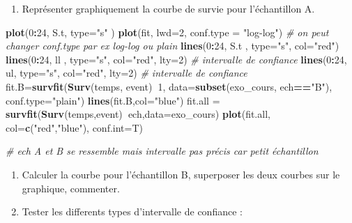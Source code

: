 \documentclass[
]{article}
\newenvironment{Shaded}{\begin{snugshade}}{\end{snugshade}}
\newcommand{\CommentTok}[1]{\textcolor[rgb]{0.56,0.35,0.01}{\textit{#1}}}
\newcommand{\DataTypeTok}[1]{\textcolor[rgb]{0.13,0.29,0.53}{#1}}
\newcommand{\DecValTok}[1]{\textcolor[rgb]{0.00,0.00,0.81}{#1}}
\newcommand{\KeywordTok}[1]{\textcolor[rgb]{0.13,0.29,0.53}{\textbf{#1}}}
\newcommand{\NormalTok}[1]{#1}
\newcommand{\OperatorTok}[1]{\textcolor[rgb]{0.81,0.36,0.00}{\textbf{#1}}}
\newcommand{\StringTok}[1]{\textcolor[rgb]{0.31,0.60,0.02}{#1}}
\providecommand{\tightlist}{%
  \setlength{\itemsep}{0pt}\setlength{\parskip}{0pt}}
\begin{document}
\begin{enumerate}
\def\labelenumi{\arabic{enumi})}
\setcounter{enumi}{2}
\tightlist
\item
  Représenter graphiquement la courbe de survie pour l'échantillon A.
\end{enumerate}

\begin{Shaded}
\begin{Highlighting}[]
\KeywordTok{plot}\NormalTok{(}\DecValTok{0}\OperatorTok{:}\DecValTok{24}\NormalTok{, S.t, }\DataTypeTok{type=}\StringTok{"s"}\NormalTok{ )}
\KeywordTok{plot}\NormalTok{(fit, }\DataTypeTok{lwd=}\DecValTok{2}\NormalTok{, }\DataTypeTok{conf.type =} \StringTok{"log-log"}\NormalTok{) }\CommentTok{# on peut changer conf.type par ex log-log ou plain}
\KeywordTok{lines}\NormalTok{(}\DecValTok{0}\OperatorTok{:}\DecValTok{24}\NormalTok{, S.t , }\DataTypeTok{type=}\StringTok{"s"}\NormalTok{, }\DataTypeTok{col=}\StringTok{"red"}\NormalTok{)}
\KeywordTok{lines}\NormalTok{(}\DecValTok{0}\OperatorTok{:}\DecValTok{24}\NormalTok{, ll , }\DataTypeTok{type=}\StringTok{"s"}\NormalTok{, }\DataTypeTok{col=}\StringTok{"red"}\NormalTok{, }\DataTypeTok{lty=}\DecValTok{2}\NormalTok{) }\CommentTok{# intervalle de confiance}
\KeywordTok{lines}\NormalTok{(}\DecValTok{0}\OperatorTok{:}\DecValTok{24}\NormalTok{, ul, }\DataTypeTok{type=}\StringTok{"s"}\NormalTok{, }\DataTypeTok{col=}\StringTok{"red"}\NormalTok{, }\DataTypeTok{lty=}\DecValTok{2}\NormalTok{)  }\CommentTok{# intervalle de confiance}
\NormalTok{fit.B=}\KeywordTok{survfit}\NormalTok{(}\KeywordTok{Surv}\NormalTok{(temps, event)}\OperatorTok{~}\DecValTok{1}\NormalTok{, }\DataTypeTok{data=}\KeywordTok{subset}\NormalTok{(exo_cours, ech}\OperatorTok{==}\StringTok{"B"}\NormalTok{), }\DataTypeTok{conf.type=}\StringTok{"plain"}\NormalTok{)}
\KeywordTok{lines}\NormalTok{(fit.B,}\DataTypeTok{col=}\StringTok{"blue"}\NormalTok{)}
\NormalTok{fit.all =}\StringTok{ }\KeywordTok{survfit}\NormalTok{(}\KeywordTok{Surv}\NormalTok{(temps,event)}\OperatorTok{~}\NormalTok{ech,}\DataTypeTok{data=}\NormalTok{exo_cours)}
\KeywordTok{plot}\NormalTok{(fit.all, }\DataTypeTok{col=}\KeywordTok{c}\NormalTok{(}\StringTok{"red"}\NormalTok{,}\StringTok{"blue"}\NormalTok{), }\DataTypeTok{conf.int=}\NormalTok{T)}

\CommentTok{# ech A et B se ressemble mais intervalle pas précis car petit échantillon}
\end{Highlighting}
\end{Shaded}

\begin{enumerate}
\def\labelenumi{\arabic{enumi})}
\setcounter{enumi}{3}
\item
  Calculer la courbe pour l'échantillon B, superposer les deux courbes
  sur le graphique, commenter.
\item
  Tester les differents types d'intervalle de confiance :
\end{enumerate}
\end{document}
